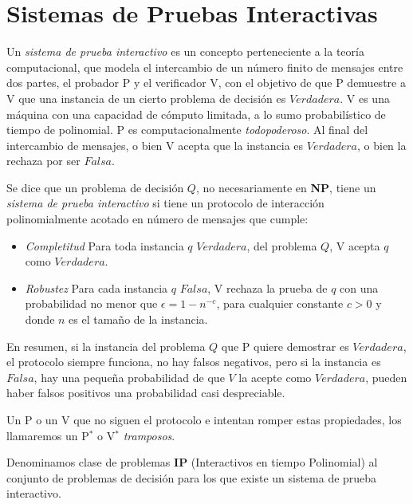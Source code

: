 \section{Sistemas de Pruebas Interactivas}

Un \textit{sistema de prueba interactivo} es un concepto perteneciente a la teoría computacional, que modela el intercambio de un número finito de mensajes entre dos partes, el probador P y el verificador V, con el objetivo de que P demuestre a V que una instancia de un cierto problema de decisión es $Verdadera$. V es una máquina con una capacidad de cómputo limitada, a lo sumo probabilístico de tiempo de polinomial. P es computacionalmente \textit{todopoderoso}. Al final del intercambio de mensajes, o bien V acepta que la instancia es $Verdadera$, o bien la rechaza por ser $Falsa$.

\begin{definition}

	
	Se dice que un problema de decisión $Q$, no necesariamente en \textbf{NP},  tiene un \textit{sistema de prueba interactivo} si tiene un protocolo de interacción polinomialmente acotado en número de mensajes que cumple:
	
	\begin{itemize}
		\item \textit{Completitud} Para toda instancia $q$ $Verdadera$, del problema $Q$, V acepta $q$ como $Verdadera$.
		\item \textit{Robustez} Para cada instancia $q$ $Falsa$, V rechaza la prueba de $q$ con una probabilidad no menor que $\epsilon = 1-n^{-c}$, para cualquier constante $c>0$ y donde $n$ es el tamaño de la instancia.
	\end{itemize}

\end{definition}

En resumen, si la instancia del problema $Q$ que P quiere demostrar es $Verdadera$, el protocolo siempre funciona, no hay falsos negativos, pero si la instancia es $Falsa$, hay una pequeña probabilidad de que $V$ la acepte como $Verdadera$, pueden haber falsos positivos una probabilidad casi despreciable.


Un P o un V que no siguen el protocolo e intentan romper estas propiedades, los llamaremos un P$^*$ o V$^*$ \textit{tramposos}.


\begin{definition}
	Denominamos clase de problemas \textbf{IP} (Interactivos en tiempo Polinomial) al conjunto de problemas de decisión para los que existe un sistema de prueba interactivo.
\end{definition}

